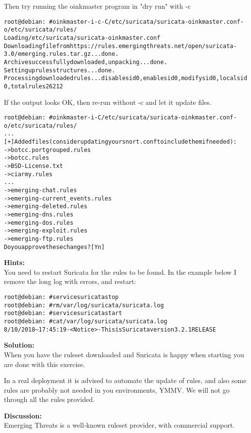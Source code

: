 \documentclass[a4paper,11pt,notitlepage]{report}
\begin{document}
Then try running the oinkmaster program in "dry run" with -c

\begin{alltt}\small
root@debian:~# oinkmaster -i -c -C /etc/suricata/suricata-oinkmaster.conf -o /etc/suricata/rules/
Loading /etc/suricata/suricata-oinkmaster.conf
Downloading file from https://rules.emergingthreats.net/open/suricata-3.0/emerging.rules.tar.gz... done.
Archive successfully downloaded, unpacking... done.
Setting up rules structures... done.
Processing downloaded rules... disablesid 0, enablesid 0, modifysid 0, localsid 0, total rules 26212
\end{alltt}

If the output looks OK, then re-run without -c and let it update files.

\begin{alltt}\small
root@debian:~# oinkmaster -i -C /etc/suricata/suricata-oinkmaster.conf -o /etc/suricata/rules/
...
[+] Added files (consider updating your snort.conf to include them if needed):
    -> botcc.portgrouped.rules
    -> botcc.rules
    -> BSD-License.txt
    -> ciarmy.rules
...
    -> emerging-chat.rules
    -> emerging-current_events.rules
    -> emerging-deleted.rules
    -> emerging-dns.rules
    -> emerging-dos.rules
    -> emerging-exploit.rules
    -> emerging-ftp.rules
Do you approve these changes? [Yn]
\end{alltt}

{\bf Hints:}\\
You need to restart Suricata for the rules to be found. In the example below I remove the long log with errors, and restart:

\begin{alltt}\small
root@debian:~# service suricata stop
root@debian:~# rm /var/log/suricata/suricata.log
root@debian:~# service suricata start
root@debian:~# cat /var/log/suricata/suricata.log
8/10/2018 -- 17:45:19 - <Notice> - This is Suricata version 3.2.1 RELEASE
\end{alltt}

{\bf Solution:}\\
When you have the ruleset downloaded and Suricata is happy when starting you are done with this exercise.

In a real deployment it is advised to automate the update of rules, and also some rules are probably not needed in you environments, YMMV. We will not go through all the rules provided.

{\bf Discussion:}\\
Emerging Threats is a well-known ruleset provider, with commercial support.
\end{document}
